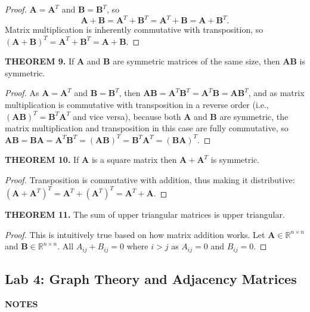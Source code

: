 \documentclass[12pt]{article}
\newcommand{\mat}[1]{\mathbf{#1}}
\newcommand{\theorem}[2]{\textbf{THEOREM #1.} #2}
\newcommand{\notes}{\textbf{NOTES}}
\begin{document}
\begin{proof}
$\mat{A} = \mat{A}^{T}$ and $\mat{B} = \mat{B}^{T}$, so 
$$\mat{A} + \mat{B} = \mat{A}^{T} + \mat{B}^{T} = \mat{A}^{T} + \mat{B} = \mat{A} + \mat{B}^{T}.$$
Matrix multiplication is inherently commutative with transposition, so $(\mat{A} + \mat{B})^{T} = \mat{A}^{T} + \mat{B}^{T} = \mat{A} + \mat{B}$.
\end{proof}

\theorem{9}{If $\mat{A}$ and $\mat{B}$ are symmetric matrices of the same size, then $\mat{AB}$ is symmetric.}

\begin{proof}
As $\mat{A} = \mat{A}^{T}$ and $\mat{B} = \mat{B}^{T}$, then $\mat{AB} = \mat{A}^{T} \mat{B}^{T} = \mat{A}^{T} \mat{B} = \mat{A} \mat{B}^{T}$, and as matrix multiplication is commutative with transposition in a reverse order (i.e., $(\mat{AB})^{T} = \mat{B}^{T} \mat{A}^{T}$ and vice versa), because both $\mat{A}$ and $\mat{B}$ are symmetric, the matrix multiplication and transposition in this case are fully commutative, so $\mat{AB} = \mat{BA} = \mat{A}^{T} \mat{B}^{T} = (\mat{AB})^{T} = \mat{B}^{T} \mat{A}^{T} = (\mat{BA})^{T}$.
\end{proof}

\theorem{10}{If $\mat{A}$ is a square matrix then $\mat{A} + \mat{A}^{T}$ is symmetric.}

\begin{proof}
Transposition is commutative with addition, thus making it distributive: $(\mat{A} + \mat{A}^{T})^{T} = \mat{A}^{T} + (\mat{A}^{T})^{T} = \mat{A}^{T} + \mat{A}.$
\end{proof}

\theorem{11}{The sum of upper triangular matrices is upper triangular.}

\begin{proof}
This is intuitively true based on how matrix addition works. Let $\mat{A} \in \mathbb{R}^{n \times n}$ and $\mat{B} \in \mathbb{R}^{n \times n}$. All $A_{ij} + B_{ij} = 0$ where $i > j$ as $A_{ij} = 0$ and $B_{ij} = 0$. 
\end{proof}

\subsection{Lab 4: Graph Theory and Adjacency Matrices}

\notes
\end{document}
